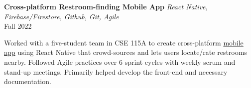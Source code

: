 \documentclass[letterpaper,10pt]{article}
\begin{document}
\begin{multicols*}{2}
  {
  \fontsize{11pt}{\baselineskip}\selectfont
  \textbf{Cross-platform Restroom-finding Mobile App}
  }
  \textit{React Native, Firebase/Firestore, Github, Git, Agile} \\
  Fall 2022
  \vspace{5px} \\
  \begin{minipage}{.5\textwidth}
    \begin{flushleft}
      Worked with a five-student team in CSE 115A to create cross-platform \href{https://github.com/CSE115AWinter2022-WePee}{mobile app} using React Native that crowd-sources and lets users locate/rate restrooms nearby. Followed Agile practices over 6 sprint cycles with weekly scrum and stand-up meetings. Primarily helped develop the front-end and necessary documentation.
    \end{flushleft}
  \end{minipage}
\end{multicols*}
\end{document}
